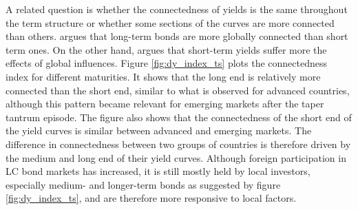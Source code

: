 {%
A related question is whether the connectedness of yields is the same throughout the term structure or whether some sections of the curves are more connected than others.
\cite{Obstfeld:2015} 
argues that long-term bonds are more globally connected than short term ones.
On the other hand, \cite{Kalemli-Ozcan:2019} argues that short-term yields suffer more the effects of global influences.
Figure \ref{fig:dy_index_ts} plots the connectedness index for different maturities.
It shows that the long end is relatively more connected than the short end, similar to what is observed for advanced countries, although this pattern became relevant for emerging markets after the taper tantrum episode.
The figure also shows that the connectedness of the short end of the yield curves is similar between advanced and emerging markets.
The difference in connectedness between two groups of countries is therefore driven by the medium and long end of their yield curves.
Although foreign participation in LC bond markets has increased, it is still mostly held by local investors, especially medium- and longer-term bonds as suggested by figure \ref{fig:dy_index_ts}, 
and are therefore more responsive to local factors.


}

